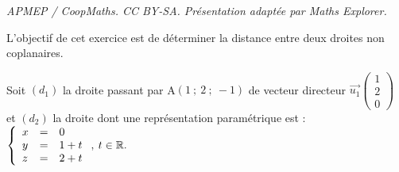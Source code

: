 \documentclass[10pt]{article}
\providecommand{\R}{\mathbb{R}}
\providecommand{\vect}[1]{\overrightarrow{#1}}
\begin{document}
\noindent\textit{APMEP / CoopMaths. CC BY-SA. Présentation adaptée par Maths Explorer.}\par\medskip
\medskip

L'objectif de cet exercice est de déterminer la distance entre deux droites non coplanaires.





Soit $(d_1)$ la droite passant par A$(1~;~2~;~-1)$ de vecteur directeur $\vect{u_1}\begin{pmatrix}1\\2\\0\end{pmatrix}$ et $(d_2)$ la droite dont une représentation paramétrique est : 
$\left\{\begin{array}{l c l}
x&=&0\\y &=& 1 + t\\z &=& 2 + t\\
\end{array}\right.,\: t  \in \R.$

\medskip
\end{document}
